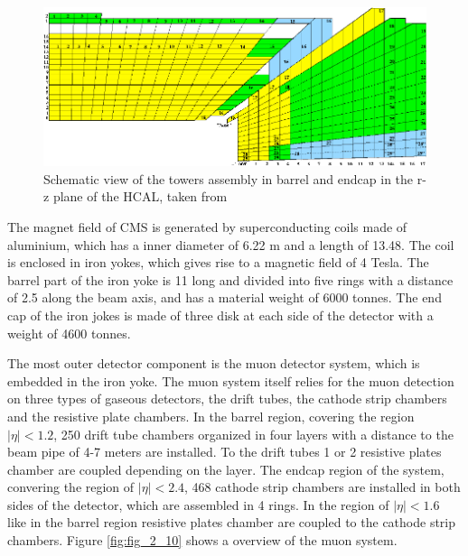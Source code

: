 \begin{figure}[ht]
	\centering
	\includegraphics[width=1\textwidth]{pictures/HCAL.pdf}

	\caption[Hadronic calorimeter of CMS]{Schematic view of the towers assembly in barrel and endcap in the r-z plane of the \gls{HCAL}, taken from \cite{CMS2}}
	\label{fig:fig_2_9}
\end{figure}

The magnet field of \gls{CMS} is generated by superconducting coils made of aluminium, which has a inner diameter of 6.22 m and a length of 13.48. The coil is enclosed in iron yokes, which gives rise to a magnetic field of 4 Tesla. The barrel part of the iron yoke is 11 long and divided into five rings with a distance of 2.5 along the beam axis, and has a material weight of 6000 tonnes. The end cap of the iron jokes is made of three disk at each side of the detector with a weight of 4600 tonnes.

The most outer detector component is the muon detector system, which is embedded in the iron yoke. The muon system itself relies for the muon detection on three types of gaseous detectors, the drift tubes, the cathode strip chambers and the resistive plate chambers. In the barrel region, covering the region $|\eta| < 1.2$, 250 drift tube chambers organized in four layers with a distance to the beam pipe of 4-7 meters are installed. To the drift tubes 1 or 2 resistive plates chamber are coupled depending on the layer. The endcap region of the system, convering the region of $|\eta| < 2.4$, 468 cathode strip chambers are installed in both sides of the detector, which are assembled in 4 rings. In the region of $|\eta| < 1.6$ like in the barrel region resistive plates chamber are coupled to the cathode strip chambers. Figure \ref{fig:fig_2_10} shows a overview of the muon system.

